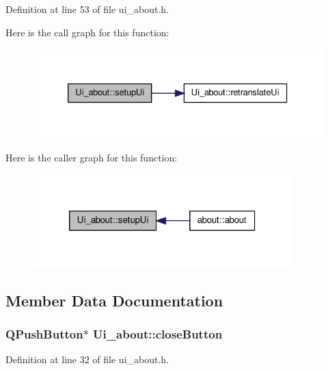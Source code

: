 Definition at line 53 of file ui\_\-about.h.



Here is the call graph for this function:
\nopagebreak
\begin{figure}[H]
\begin{center}
\leavevmode
\includegraphics[width=330pt]{classUi__about_ade605029c03d96bbda6ca78d9e982804_cgraph}
\end{center}
\end{figure}




Here is the caller graph for this function:
\nopagebreak
\begin{figure}[H]
\begin{center}
\leavevmode
\includegraphics[width=284pt]{classUi__about_ade605029c03d96bbda6ca78d9e982804_icgraph}
\end{center}
\end{figure}




\subsection{Member Data Documentation}
\hypertarget{classUi__about_a7c764d7b424b82cda32db2aa1067fba4}{
\subsubsection[{closeButton}]{\setlength{\rightskip}{0pt plus 5cm}QPushButton$\ast$ {\bf Ui\_\-about::closeButton}}}
\label{classUi__about_a7c764d7b424b82cda32db2aa1067fba4}


Definition at line 32 of file ui\_\-about.h.

